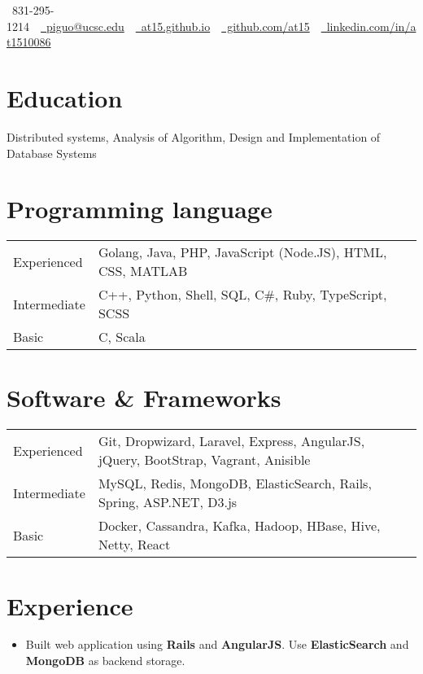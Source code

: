 \documentclass[10pt, letterpaper]{simple-cv}
\begin{document}
\centerline{\faMobile\ 831-295-1214\ \
\href{mailto:piguo@ucsc.edu}{\faEnvelope\ piguo@ucsc.edu}\ \
\href{https://at15.github.io}{\faHome\ at15.github.io}\ \
\href{https://github.com/at15}{\faGithubSquare\ github.com/at15}\ \
\href{https://www.linkedin.com/in/at1510086}{\faLinkedinSquare\ linkedin.com/in/at1510086}}

\section{Education}
Distributed systems, Analysis of Algorithm, Design and Implementation of Database Systems

\section{Programming language}
\begin{tabular}{ l l }
 Experienced &  Golang, Java, PHP, JavaScript (Node.JS), HTML, CSS, MATLAB \\
 Intermediate & C++, Python, Shell, SQL, C\#, Ruby, TypeScript, SCSS \\
 Basic & C, Scala
\end{tabular}

\section{Software \& Frameworks}
\begin{tabular}{ l l }
 Experienced & Git, Dropwizard, Laravel, Express, AngularJS, jQuery, BootStrap, Vagrant, Anisible\\
 Intermediate & MySQL, Redis, MongoDB, ElasticSearch, Rails, Spring, ASP.NET, D3.js \\
 Basic & Docker, Cassandra, Kafka, Hadoop, HBase, Hive, Netty, React
\end{tabular}

\section{Experience}

\begin{itemize}
\item Built web application using \textbf{Rails} and \textbf{AngularJS}. Use \textbf{ElasticSearch} and \textbf{MongoDB} as backend storage.
\end{itemize}
\end{document}
